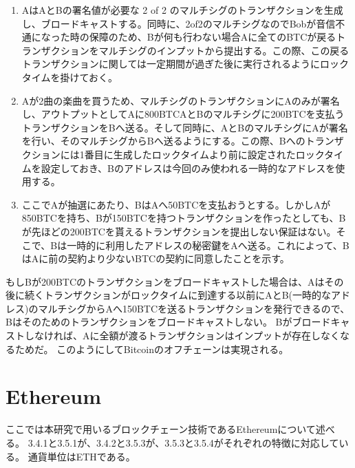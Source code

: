 \begin{enumerate}
\item AはAとBの署名値が必要な 2 of 2 のマルチシグのトランザクションを生成し、ブロードキャストする。同時に、2of2のマルチシグなのでBobが音信不通になった時の保障のため、Bが何も行わない場合Aに全てのBTCが戻るトランザクションをマルチシグのインプットから提出する。この際、この戻るトランザクションに関しては一定期間が過ぎた後に実行されるようにロックタイムを掛けておく。
\item Aが2曲の楽曲を買うため、マルチシグのトランザクションにAのみが署名し、アウトプットとしてAに800BTCAとBのマルチシグに200BTCを支払うトランザクションをBへ送る。そして同時に、AとBのマルチシグにAが署名を行い、そのマルチシグからBへ送るようにする。この際、Bへのトランザクションには1番目に生成したロックタイムより前に設定されたロックタイムを設定しておき、Bのアドレスは今回のみ使われる一時的なアドレスを使用する。
\item ここでAが抽選にあたり、BはAへ50BTCを支払おうとする。しかしAが850BTCを持ち、Bが150BTCを持つトランザクションを作ったとしても、Bが先ほどの200BTCを貰えるトランザクションを提出しない保証はない。そこで、Bは一時的に利用したアドレスの秘密鍵をAへ送る。これによって、BはAに前の契約より少ないBTCの契約に同意したことを示す。
\end{enumerate}
もしBが200BTCのトランザクションをブロードキャストした場合は、Aはその後に続くトランザクションがロックタイムに到達する以前にAとB(一時的なアドレス)のマルチシグからAへ150BTCを送るトランザクションを発行できるので、Bはそのためのトランザクションをブロードキャストしない。
Bがブロードキャストしなければ、Aに全額が渡るトランザクションはインプットが存在しなくなるためだ。
このようにしてBitcoinのオフチェーンは実現される。

\section{Ethereum}
ここでは本研究で用いるブロックチェーン技術であるEthereumについて述べる。
3.4.1と3.5.1が、3.4.2と3.5.3が、3.5.3と3.5.4がそれぞれの特徴に対応している。
通貨単位はETHである。

